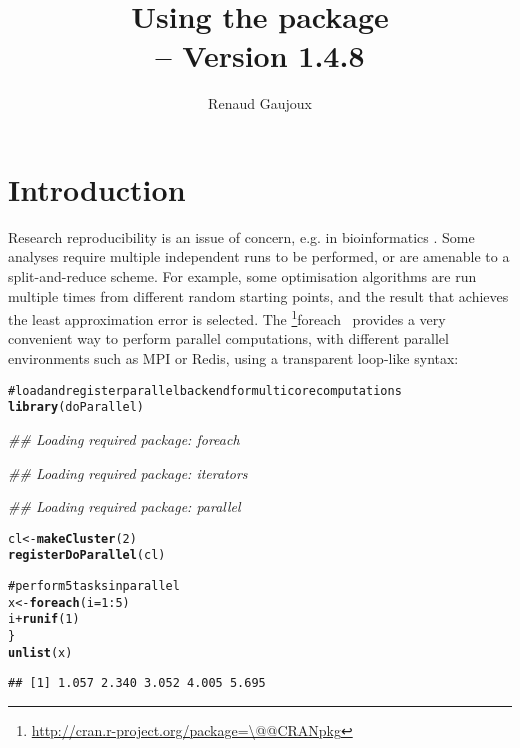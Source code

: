 \documentclass[a4paper,12pt]{article}\usepackage{graphicx, color}
\title{Using the \code{doRNG} package\\
{\small \Rpkg{doRNG} -- Version 1.4.8}}
\author{Renaud Gaujoux}
\makeatletter
\newcommand{\hlfunctioncall}[1]{\textcolor[rgb]{0.501960784313725,0,0.329411764705882}{\textbf{#1}}}%
\newcommand{\hlcomment}[1]{\textcolor[rgb]{0.180392156862745,0.6,0.341176470588235}{#1}}%
\newenvironment{kframe}{%
 \def\at@end@of@kframe{}%
 \ifinner\ifhmode%
  \def\at@end@of@kframe{\end{minipage}}%
  \begin{minipage}{\columnwidth}%
 \fi\fi%
 \def\FrameCommand##1{\hskip\@totalleftmargin \hskip-\fboxsep
 \colorbox{shadecolor}{##1}\hskip-\fboxsep
     \hskip-\linewidth \hskip-\@totalleftmargin \hskip\columnwidth}%
 \MakeFramed {\advance\hsize-\width
   \@totalleftmargin\z@ \linewidth\hsize
   \@setminipage}}%
 {\par\unskip\endMakeFramed%
 \at@end@of@kframe}
\newenvironment{knitrout}{}{} %
\renewenvironment{knitrout}{\begin{footnotesize}}{\end{footnotesize}}
\newcommand{\pkgname}[1]{\textit{#1}\xspace}
\newcommand{\CRANurl}[1]{\url{http://cran.r-project.org/package=#1}}
\def\CRANpkg{\@ifstar\@CRANpkg\@@CRANpkg}
\def\@CRANpkg#1{\href{http://cran.r-project.org/package=#1}{\pkgname{#1}}\footnote{\CRANurl{#1}}}
\def\@@CRANpkg#1{\href{http://cran.r-project.org/package=#1}{\pkgname{#1}} package\footnote{\CRANurl{#1}}}
\newcommand{\citeCRANpkg}[1]{\CRANpkg{#1}~\cite{#1}}
\makeatother
\begin{document}
\maketitle

\tableofcontents

\section*{Introduction}

Research reproducibility is an issue of concern, e.g. in bioinformatics
\cite{Hothorn2011,Stodden2011,Ioannidis2008}.
Some analyses require multiple independent runs to be performed, or are amenable to a split-and-reduce scheme.
For example, some optimisation algorithms are run multiple times from different
random starting points, and the result that achieves the least approximation error is selected.
The \citeCRANpkg{foreach} provides a very convenient way to perform parallel computations, with different parallel environments such as MPI or Redis, using a transparent loop-like syntax:




\begin{knitrout}
\color{fgcolor}\begin{kframe}
\begin{alltt}
\hlcomment{# load and register parallel backend for multicore computations}
\hlfunctioncall{library}(doParallel)
\end{alltt}


{\ttfamily\noindent\itshape\textcolor{messagecolor}{\#\# Loading required package: foreach}}

{\ttfamily\noindent\itshape\textcolor{messagecolor}{\#\# Loading required package: iterators}}

{\ttfamily\noindent\itshape\textcolor{messagecolor}{\#\# Loading required package: parallel}}\begin{alltt}
cl <- \hlfunctioncall{makeCluster}(2)
\hlfunctioncall{registerDoParallel}(cl)

\hlcomment{# perform 5 tasks in parallel}
x <- \hlfunctioncall{foreach}(i = 1:5) %dopar% \{
    i + \hlfunctioncall{runif}(1)
\}
\hlfunctioncall{unlist}(x)
\end{alltt}
\begin{verbatim}
## [1] 1.057 2.340 3.052 4.005 5.695
\end{verbatim}
\end{kframe}
\end{knitrout}
\end{document}
